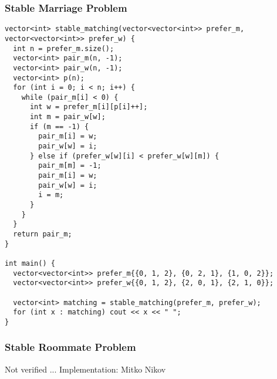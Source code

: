 \newpage

\subsubsection{Stable Marriage Problem}

\begin{lstlisting}
vector<int> stable_matching(vector<vector<int>> prefer_m, vector<vector<int>> prefer_w) {
  int n = prefer_m.size();
  vector<int> pair_m(n, -1);
  vector<int> pair_w(n, -1);
  vector<int> p(n);
  for (int i = 0; i < n; i++) {
    while (pair_m[i] < 0) {
      int w = prefer_m[i][p[i]++];
      int m = pair_w[w];
      if (m == -1) {
        pair_m[i] = w;
        pair_w[w] = i;
      } else if (prefer_w[w][i] < prefer_w[w][m]) {
        pair_m[m] = -1;
        pair_m[i] = w;
        pair_w[w] = i;
        i = m;
      }
    }
  }
  return pair_m;
}

int main() {
  vector<vector<int>> prefer_m{{0, 1, 2}, {0, 2, 1}, {1, 0, 2}};
  vector<vector<int>> prefer_w{{0, 1, 2}, {2, 0, 1}, {2, 1, 0}};

  vector<int> matching = stable_matching(prefer_m, prefer_w);
  for (int x : matching) cout << x << " ";
}
\end{lstlisting}

\subsubsection{Stable Roommate Problem}

Not verified ... Implementation: Mitko Nikov

